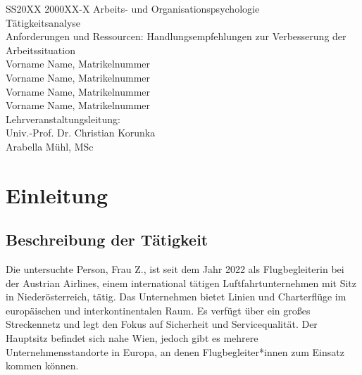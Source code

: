 \documentclass[12pt, a4paper]{article}
\begin{document}
\begin{titlepage}
    \begin{center}
        \large SS20XX 2000XX-X Arbeits- und Organisationspsychologie \\
        \vspace{1in}
        \Large Tätigkeitsanalyse \\
        \LARGE Anforderungen und Ressourcen:
        Handlungsempfehlungen zur Verbesserung der
        Arbeitssituation \\
        \vspace*{1in}
        \large 
        Vorname Name, Matrikelnummer \\
        Vorname Name, Matrikelnummer \\
        Vorname Name, Matrikelnummer \\
        Vorname Name, Matrikelnummer \\
        \vfill
        Lehrveranstaltungsleitung: \\
        Univ.-Prof. Dr. Christian Korunka \\
        Arabella Mühl, MSc \\
        \vspace{1in}   
    \end{center}
\end{titlepage}

\tableofcontents

\newpage

\section{Einleitung}

\subsection{Beschreibung der Tätigkeit}


Die untersuchte Person, Frau Z., ist seit dem Jahr 2022 als Flugbegleiterin bei der Austrian Airlines, 
einem international tätigen Luftfahrtunternehmen mit Sitz in Niederösterreich, 
tätig. Das Unternehmen bietet Linien und Charterflüge im europäischen und interkontinentalen Raum. 
Es verfügt über ein großes Streckennetz und legt den Fokus auf Sicherheit und Servicequalität. 
Der Hauptsitz befindet sich nahe Wien, jedoch gibt es mehrere Unternehmensstandorte in Europa, an denen Flugbegleiter*innen zum Einsatz kommen können.
\end{document}
